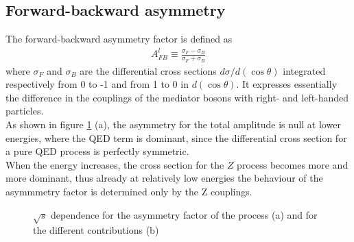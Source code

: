 \documentclass[12pt,letterpaper]{article}
\begin{document}

\subsection{Forward-backward asymmetry}

The forward-backward asymmetry factor is defined as 
\begin{align*}
A_{FB}^l \equiv \frac{\sigma_F - \sigma_B}{\sigma_F+\sigma_B} 
\end{align*}
where $\sigma_F$ and $\sigma_B$ are the differential cross sections $d\sigma/d(\cos\theta)$ integrated respectively from 0 to -1 and from 1 to 0 in $d(\cos\theta)$. It expresses essentially the difference in the couplings of the mediator bosons with right- and left-handed particles. \\
As shown in figure \ref{asymm_terms} (a), the asymmetry for the total amplitude is null at lower energies, where the QED term is dominant, since the differential cross section for a pure QED process is perfectly symmetric.\\
When the energy increases, the cross section for the $Z$ process becomes more and more dominant, thus already at relatively low energies the behaviour of the asymmmetry factor is determined only by the Z couplings.


\begin{figure}[!ht]
\centering
{}
\caption{$\sqrt{s}$ dependence for the asymmetry factor of the process (a) and for the different contributions (b)}
\label{asymm_terms}
\end{figure}
\end{document}
